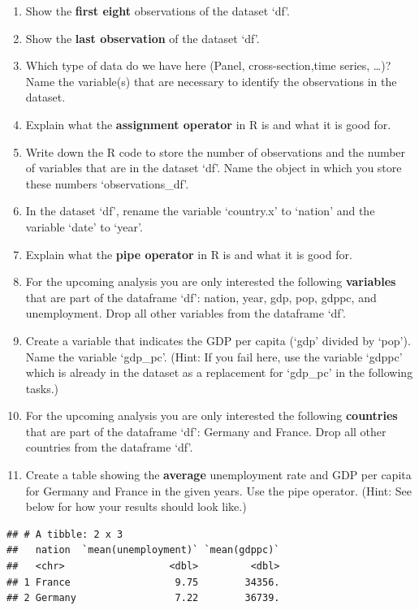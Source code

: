 \documentclass[
  12pt,
  oneside]{book}
\theoremstyle{definition}
\theoremstyle{definition}
\theoremstyle{definition}
\theoremstyle{definition}
\theoremstyle{remark}
\begin{document}
\begin{enumerate}
\def\labelenumi{(\arabic{enumi})}
\setcounter{enumi}{4}
\item
  Show the \textbf{first eight} observations of the dataset `df'.
\item
  Show the \textbf{last observation} of the dataset `df'.
\item
  Which type of data do we have here (Panel, cross-section,time series, \ldots)?
  Name the variable(s) that are necessary to identify the observations in the dataset.
\item
  Explain what the \textbf{assignment operator} in R is and what it is good for.
\item
  Write down the R code to store the number of observations and the number of variables
  that are in the dataset `df'. Name the object in which you store these numbers `observations\_df'.
\item
  In the dataset `df', rename the variable `country.x' to `nation' and the variable `date' to `year'.
\item
  Explain what the \textbf{pipe operator} in R is and what it is good for.
\item
  For the upcoming analysis you are only interested the following \textbf{variables} that are part of the dataframe `df': nation, year, gdp, pop, gdppc, and unemployment. Drop all other variables from the dataframe `df'.
\item
  Create a variable that indicates the GDP per capita (`gdp' divided by `pop').
  Name the variable `gdp\_pc'. (Hint: If you fail here, use the variable `gdppc' which is
  already in the dataset as a replacement for `gdp\_pc' in the following tasks.)
\item
  For the upcoming analysis you are only interested the following \textbf{countries}
  that are part of the dataframe `df': Germany and France. Drop all other
  countries from the dataframe `df'.
\item
  Create a table showing the \textbf{average} unemployment rate and GDP per capita for Germany
  and France in the given years. Use the pipe operator. (Hint: See below for how your results should
  look like.)
\end{enumerate}

\begin{verbatim}
## # A tibble: 2 x 3
##   nation  `mean(unemployment)` `mean(gdppc)`
##   <chr>                  <dbl>         <dbl>
## 1 France                  9.75        34356.
## 2 Germany                 7.22        36739.
\end{verbatim}
\end{document}
